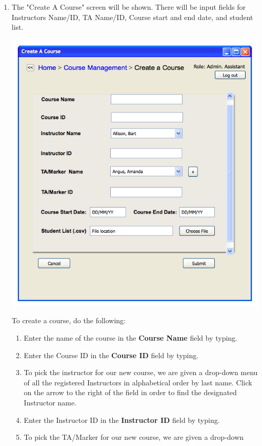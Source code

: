 \documentclass{article}
\begin{document}
\begin{enumerate}
\begin{center}
   \end{center}
   \label{courseManage}
 \item The "Create A Course" screen will be shown. There will be input fields
   for Instructors Name/ID, TA Name/ID, Course start and end date, and student list.
   \begin{center}
     \includegraphics[scale=0.55]{../images/UIMockups/pngs/createACourse}
   \end{center}
   \label{createCourse}
   To create a course, do the following:
   \begin{enumerate}
     \item Enter the name of the course in the \textbf{Course Name} field by typing.
     \item Enter the Course ID in the \textbf{Course ID} field by typing.
     \item To pick the instructor for our new course, we are given a drop-down
       menu of all the registered Instructors in alphabetical order by last
       name. Click on the arrow to the right of the field in order to find
       the designated Instructor name.
     \item Enter the Instructor ID in the \textbf{Instructor ID} field by typing.
     \item To pick the TA/Marker for our new course, we are given a drop-down

\end{enumerate}
\end{enumerate}
\end{document}
